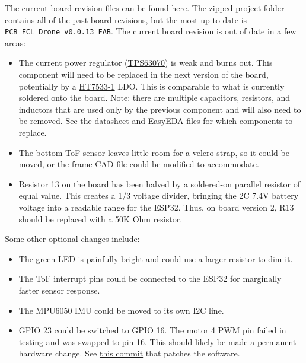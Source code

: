 \documentclass[12pt, titlepage]{article}
\begin{document}
The current board revision files can be found \href{https://github.com/Team-Wingfeather/fcl_senior_design/tree/main/pcb/v1/EasyEDA}{here}. The zipped project folder contains all of the past board revisions, but the most up-to-date is  \texttt{PCB\_FCL\_Drone\_v0.0.13\_FAB}.
The current board revision is out of date in a few areas:
\begin{itemize}
\item The current power regulator (\href{https://github.com/Team-Wingfeather/fcl_senior_design/blob/main/resources/datasheets/C109322-TPS63070RNMR.pdf}{TPS63070}) is weak and burns out. This component will need to be replaced in the next version of the board, potentially by a \href{https://jlcpcb.com/partdetail/HoltekSemicon-HT75331/C14289}{HT7533-1} LDO. This is comparable to what is currently soldered onto the board. Note: there are multiple capacitors, resistors, and inductors that are used only by the previous component and will also need to be removed. See the \href{https://github.com/Team-Wingfeather/fcl_senior_design/blob/main/resources/datasheets/C109322-TPS63070RNMR.pdf}{datasheet} and \href{https://github.com/Team-Wingfeather/fcl_senior_design/tree/main/pcb/v1/EasyEDA}{EasyEDA} files for which components to replace.
\item The bottom ToF sensor leaves little room for a velcro strap, so it could be moved, or the frame CAD file could be modified to accommodate.
\item Resistor 13 on the board has been halved by a soldered-on parallel resistor of equal value. This creates a 1/3 voltage divider, bringing the 2C 7.4V battery voltage into a readable range for the ESP32. Thus, on board version 2, R13 should be replaced with a 50K Ohm resistor.
\end{itemize}
Some other optional changes include:
\begin{itemize}
\item The green LED is painfully bright and could use a larger resistor to dim it.
\item The ToF interrupt pins could be connected to the ESP32 for marginally faster sensor response.
\item The MPU6050 IMU could be moved to its own I2C line.
\item GPIO 23 could be switched to GPIO 16. The motor 4 PWM pin failed in testing and was swapped to pin 16. This should likely be made a permanent hardware change. See \href{https://github.com/Team-Wingfeather/fcl_senior_design/commit/29bd241f75058da32211addb992e50635beb5c23}{this commit} that patches the software.
\end{itemize}
\end{document}
